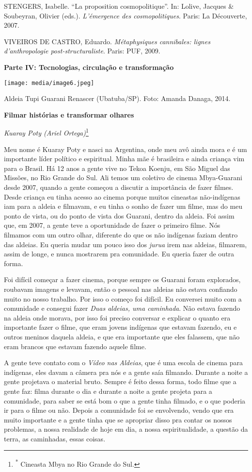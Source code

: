 STENGERS, Isabelle. ``La proposition cosmopolitique''. In: Lolive,
Jacques \& Soubeyran, Olivier (eds.). \emph{L'émergence des
cosmopolitiques}. Paris: La Découverte, 2007.

VIVEIROS DE CASTRO, Eduardo. \emph{Métaphysiques cannibales: lignes
d'anthropologie post-structuraliste}. Paris: PUF, 2009.

\textbf{Parte IV: Tecnologias, circulação e transformação}

\texttt{[image: media/image6.jpeg]}

Aldeia Tupi Guarani Renascer (Ubatuba/SP). Foto: Amanda Danaga, 2014.

\textbf{Filmar histórias e transformar olhares}

\emph{Kuaray Poty (Ariel Ortega)}\footnote{\textsuperscript{*} Cineasta
  Mbya no Rio Grande do Sul.}

Meu nome é Kuaray Poty e nasci na Argentina, onde meu avô ainda mora e é
um importante líder político e espiritual. Minha mãe é brasileira e
ainda criança vim para o Brasil. Há 12 anos a gente vive no Tekoa
Koenju, em São Miguel das Missões, no Rio Grande do Sul. Ali temos um
coletivo de cinema Mbya-Guarani desde 2007, quando a gente começou a
discutir a importância de fazer filmes. Desde criança eu tinha acesso ao
cinema porque muitos cineastas não-indígenas iam para a aldeia e
filmavam, e eu tinha o sonho de fazer um filme, mas do meu ponto de
vista, ou do ponto de vista dos Guarani, dentro da aldeia. Foi assim
que, em 2007, a gente teve a oportunidade de fazer o primeiro filme. Nós
filmamos com um outro olhar, diferente do que os não indígenas faziam
dentro das aldeias. Eu queria mudar um pouco isso dos \emph{jurua} irem
nas aldeias, filmarem, assim de longe, e nunca mostrarem pra comunidade.
Eu queria fazer de outra forma.

Foi difícil começar a fazer cinema, porque sempre os Guarani foram
explorados, roubavam imagens e levavam, então o pessoal nas aldeias não
estava confiando muito no nosso trabalho. Por isso o começo foi difícil.
Eu conversei muito com a comunidade e consegui fazer \emph{Duas aldeias,
uma caminhada}. Não estava fazendo na aldeia onde morava, por isso foi
preciso conversar e explicar o quanto era importante fazer o filme, que
eram jovens indígenas que estavam fazendo, eu e outros meninos daquela
aldeia, e que era importante que eles falassem, que não eram brancos que
estavam fazendo aquele filme.

A gente teve contato com o \emph{Vídeo nas Aldeias}, que é uma escola de
cinema para indígenas, eles davam a câmera pra nós e a gente saía
filmando. Durante a noite a gente projetava o material bruto. Sempre é
feito dessa forma, todo filme que a gente faz: filma durante o dia e
durante a noite a gente projeta para a comunidade, para saber se está
bom o que a gente tinha filmado, e o que poderia ir para o filme ou não.
Depois a comunidade foi se envolvendo, vendo que era muito importante e
a gente tinha que se apropriar disso pra contar os nossos problemas, a
nossa realidade de hoje em dia, a nossa espiritualidade, a questão da
terra, as caminhadas, essas coisas.

